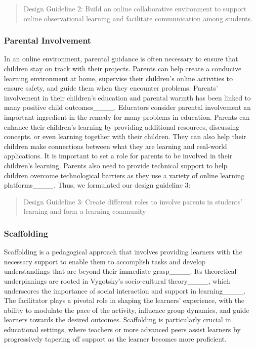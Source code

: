 \begin{quote}
  Design Guideline 2: Build an online collaborative environment to support online observational learning and facilitate communication among students.
\end{quote}

\subsubsection{Parental Involvement}
In an online environment, parental guidance is often necessary to ensure that children stay on track with their projects. Parents can help create a conducive learning environment at home, supervise their children's online activities to ensure safety, and guide them when they encounter problems. Parents' involvement in their children's education and parental warmth has been linked to many positive child outcomes____. Educators consider parental involvement an important ingredient in the remedy for many problems in education. Parents can enhance their children's learning by providing additional resources, discussing concepts, or even learning together with their children. They can also help their children make connections between what they are learning and real-world applications. It is important to set a role for parents to be involved in their children's learning. Parents also need to provide technical support to help children overcome technological barriers as they use a variety of online learning platforms____. Thus, we formulated our design guideline 3:
  
\begin{quote}  
  Design Guideline 3: Create different roles to involve parents in students' learning and form a learning community
\end{quote}
  
\subsubsection{Scaffolding}
Scaffolding is a pedagogical approach that involves providing learners with the necessary support to enable them to accomplish tasks and develop understandings that are beyond their immediate grasp____. Its theoretical underpinnings are rooted in Vygotsky’s socio-cultural theory____, which underscores the importance of social interaction and support in learning____. The facilitator plays a pivotal role in shaping the learners’ experience, with the ability to modulate the pace of the activity, influence group dynamics, and guide learners towards the desired outcomes. Scaffolding is particularly crucial in educational settings, where teachers or more advanced peers assist learners by progressively tapering off support as the learner becomes more proficient. 

